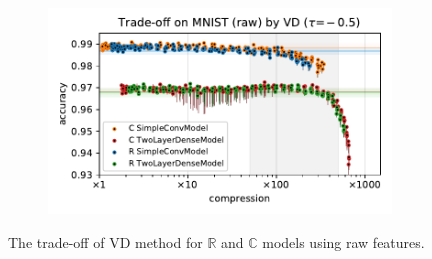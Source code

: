 \documentclass[a4paper,10pt,twocolumn]{article}
\newcommand{\real}{\mathbb{R}}
\newcommand{\cplx}{\mathbb{C}}
\begin{document}
\begin{figure}[b]
\begin{subfigure}[b]{0.5\columnwidth}
  \end{subfigure}%
  \begin{subfigure}[b]{0.5\columnwidth}
    \centering
    \includegraphics[width=\linewidth]{figure__mnist-like__trade-off/appendix__VD__mnist__raw__-0.5.pdf}
  \end{subfigure}
  \caption{%
    The trade-off of VD method for $\real$ and $\cplx$ models using raw features.
  }
  \label{fig:appendix__mnist-like__trade-off__VD__raw}
\end{figure}
\end{document}
